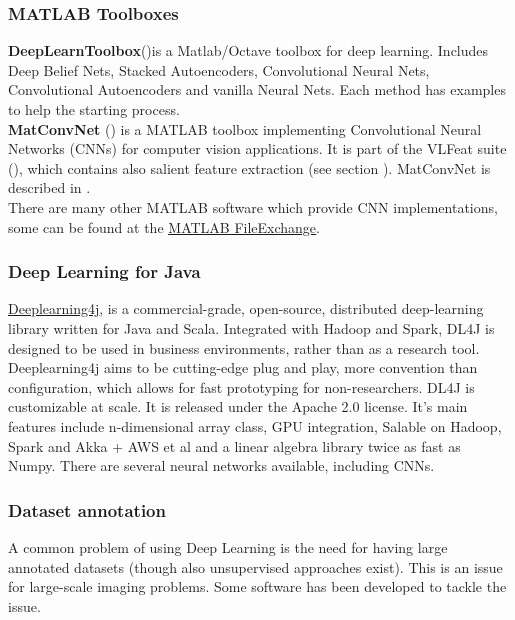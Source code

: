 {\subsubsection{MATLAB Toolboxes}
{\bf DeepLearnToolbox}(\cite{deeplearntoolbox_soft})is a Matlab/Octave toolbox for deep learning. Includes Deep Belief Nets, Stacked Autoencoders, Convolutional Neural Nets, Convolutional Autoencoders and vanilla Neural Nets. Each method has examples to help the starting process.\\
{\bf MatConvNet} (\cite{matconvnet_soft}) is a MATLAB toolbox implementing Convolutional Neural Networks (CNNs) for computer vision applications. It is part of the VLFeat suite (\cite{vlfeat_soft}), which contains also salient feature extraction (see section ). MatConvNet is described in \cite{matconvnet_paper}.\\
 There are many other MATLAB software which provide CNN implementations, some can be found at the \href{http://www.mathworks.com/matlabcentral/fileexchange/24291-cnn-convolutional-neural-network-class}{\underline{MATLAB FileExchange}}.

\subsubsection{Deep Learning for Java}
\href{http://deeplearning4j.org/}{\underline{Deeplearning4j}}, \cite{dl4j} is a commercial-grade, open-source, distributed deep-learning library written for Java and Scala. Integrated with Hadoop and Spark, DL4J is designed to be used in business environments, rather than as a research tool. 
Deeplearning4j aims to be cutting-edge plug and play, more convention than configuration, which allows for fast prototyping for non-researchers. DL4J is customizable at scale. It is released under the Apache 2.0 license. It's main features include n-dimensional array class, GPU integration,  Salable on Hadoop, Spark and Akka + AWS et al and a linear algebra library twice as fast as Numpy. There are several neural networks available, including CNNs.


\subsubsection{Dataset annotation}\label{subsec:dbannot}
A common problem of using Deep Learning is the need for having large annotated datasets (though also unsupervised approaches exist). This is an issue for large-scale imaging problems. Some software has been developed to tackle the issue.

}
